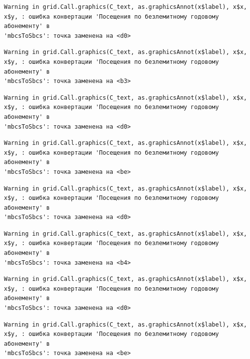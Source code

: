 \documentclass[
  letterpaper,
  DIV=11,
  numbers=noendperiod]{scrreprt}
\begin{document}
\begin{verbatim}
Warning in grid.Call.graphics(C_text, as.graphicsAnnot(x$label), x$x,
x$y, : ошибка конвертации 'Посещения по безлемитному годовому абонементу' в
'mbcsToSbcs': точка заменена на <d0>
\end{verbatim}

\begin{verbatim}
Warning in grid.Call.graphics(C_text, as.graphicsAnnot(x$label), x$x,
x$y, : ошибка конвертации 'Посещения по безлемитному годовому абонементу' в
'mbcsToSbcs': точка заменена на <b3>
\end{verbatim}

\begin{verbatim}
Warning in grid.Call.graphics(C_text, as.graphicsAnnot(x$label), x$x,
x$y, : ошибка конвертации 'Посещения по безлемитному годовому абонементу' в
'mbcsToSbcs': точка заменена на <d0>
\end{verbatim}

\begin{verbatim}
Warning in grid.Call.graphics(C_text, as.graphicsAnnot(x$label), x$x,
x$y, : ошибка конвертации 'Посещения по безлемитному годовому абонементу' в
'mbcsToSbcs': точка заменена на <be>
\end{verbatim}

\begin{verbatim}
Warning in grid.Call.graphics(C_text, as.graphicsAnnot(x$label), x$x,
x$y, : ошибка конвертации 'Посещения по безлемитному годовому абонементу' в
'mbcsToSbcs': точка заменена на <d0>
\end{verbatim}

\begin{verbatim}
Warning in grid.Call.graphics(C_text, as.graphicsAnnot(x$label), x$x,
x$y, : ошибка конвертации 'Посещения по безлемитному годовому абонементу' в
'mbcsToSbcs': точка заменена на <b4>
\end{verbatim}

\begin{verbatim}
Warning in grid.Call.graphics(C_text, as.graphicsAnnot(x$label), x$x,
x$y, : ошибка конвертации 'Посещения по безлемитному годовому абонементу' в
'mbcsToSbcs': точка заменена на <d0>
\end{verbatim}

\begin{verbatim}
Warning in grid.Call.graphics(C_text, as.graphicsAnnot(x$label), x$x,
x$y, : ошибка конвертации 'Посещения по безлемитному годовому абонементу' в
'mbcsToSbcs': точка заменена на <be>
\end{verbatim}
\end{document}
